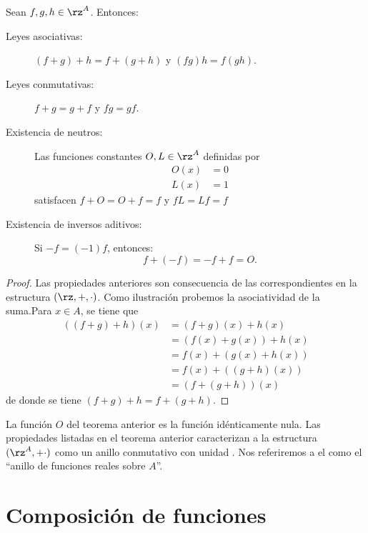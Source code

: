 \begin{theorem}
Sean $f,g,h\in\rz^{A}$. Entonces:

\begin{description}
\item[Leyes asociativas:] $(f+g)+h=f+(g+h)$ y $(fg)h=f(gh)$.

\item[Leyes conmutativas:] $f+g=g+f$ y $fg=gf$.

\item[Existencia de neutros:] Las funciones constantes $O,L\in\rz^{A}$
definidas por
\begin{align}
O(x)  &  =0\\
L(x)  &  =1
\end{align}
satisfacen $f+O=O+f=f$ y $fL=Lf=f$

\item[Existencia de inversos aditivos:] Si $-f=(-1)f$, entonces:
\[
f+(-f)=-f+f=O.
\]

\end{description}
\end{theorem}

\begin{proof}
Las propiedades anteriores son consecuencia de las correspondientes en la
estructura $(\rz,+,\cdot)$. Como ilustraci\'{o}n probemos la asociatividad de
la suma.\newline Para $x\in A$, se tiene que
\begin{align*}
((f+g)+h)(x)  &  =(f+g)(x)+h(x)\\
&  =(f(x)+g(x))+h(x)\\
&  =f(x)+(g(x)+h(x))\\
&  =f(x)+((g+h)(x))\\
&  =(f+(g+h))(x)
\end{align*}
de donde se tiene $(f+g)+h=f+(g+h)$.
\end{proof}

La funci\'{o}n $O$ del teorema anterior es la funci\'{o}n id\'{e}nticamente%
nula. Las propiedades listadas en el teorema anterior caracterizan a la
estructura $(\rz^{A},+\cdot)$ como un anillo conmutativo con unidad . Nos
referiremos a el como el \textquotedblleft anillo de funciones reales sobre
$A$\textquotedblright.

\section{Composici\'{o}n de funciones}

